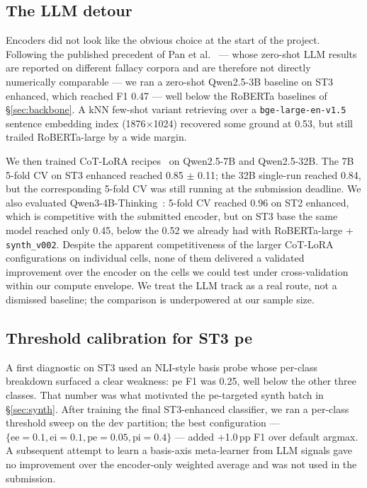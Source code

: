\subsection{The LLM detour}
\label{sec:llm-detour}

Encoders did not look like the obvious choice at the start of the project. Following the published precedent of Pan et al.~\cite{pan2024zeroshotfallacy} --- whose zero-shot LLM results are reported on different fallacy corpora and are therefore not directly numerically comparable --- we ran a zero-shot Qwen2.5-3B baseline on ST3 enhanced, which reached F1 0.47 --- well below the RoBERTa baselines of \S\ref{sec:backbone}. %
A kNN few-shot variant retrieving over a \texttt{bge-large-en-v1.5} sentence embedding index (1876$\times$1024) recovered some ground at 0.53, but still trailed RoBERTa-large by a wide margin. %

We then trained CoT-LoRA recipes~\cite{hu2022lora,dettmers2023qlora,wei2022cot} on Qwen2.5-7B and Qwen2.5-32B. The 7B 5-fold CV on ST3 enhanced reached 0.85 $\pm$ 0.11; the 32B single-run reached 0.84, but the corresponding 5-fold CV was still running at the submission deadline. %
We also evaluated Qwen3-4B-Thinking~\cite{qwen3}: 5-fold CV reached 0.96 on ST2 enhanced, which is competitive with the submitted encoder, but on ST3 base the same model reached only 0.45, below the 0.52 we already had with RoBERTa-large + \texttt{synth\_v002}. %
Despite the apparent competitiveness of the larger CoT-LoRA configurations on individual cells, none of them delivered a validated improvement over the encoder on the cells we could test under cross-validation within our compute envelope. We treat the LLM track as a real route, not a dismissed baseline; the comparison is underpowered at our sample size.

\subsection{Threshold calibration for ST3 \textsf{pe}}
\label{sec:thresholds}

A first diagnostic on ST3 used an NLI-style basis probe whose per-class breakdown surfaced a clear weakness: \textsf{pe} F1 was 0.25, well below the other three classes. %
That number was what motivated the \textsf{pe}-targeted synth batch in \S\ref{sec:synth}. After training the final ST3-enhanced classifier, we ran a per-class threshold sweep on the dev partition; the best configuration --- $\{\text{ee}=0.1, \text{ei}=0.1, \text{pe}=0.05, \text{pi}=0.4\}$ --- added +1.0\,pp F1 over default argmax. %
A subsequent attempt to learn a basis-axis meta-learner from LLM signals gave no improvement over the encoder-only weighted average and was not used in the submission. %
